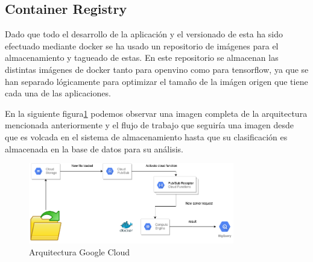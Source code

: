 \subsection{Container Registry}\label{subsec:container-registry}
Dado que todo el desarrollo de la aplicación y el versionado de esta ha sido efectuado mediante docker se ha usado
un repositorio de imágenes para el almacenamiento y tagueado de estas.
En este repositorio se almacenan las distintas imágenes de docker tanto para openvino como para tensorflow, ya que se han
separado lógicamente para optimizar el tamaño de la imágen origen que tiene cada una de las aplicaciones.


En la siguiente figura\ref{fig:Arquitectura Google Cloud} podemos observar una imagen completa de la arquitectura mencionada anteriormente y el flujo de trabajo
que seguiría una imagen desde que es volcada en el sistema de almacenamiento hasta que su clasificación es almacenada en la base de datos
para su análisis.

\begin{figure}
    \centering
    \includegraphics[width=0.8\textwidth]{images/chapter4/cloud_architecture.png}
    \caption{Arquitectura Google Cloud}
    \label{fig:Arquitectura Google Cloud}
\end{figure}


